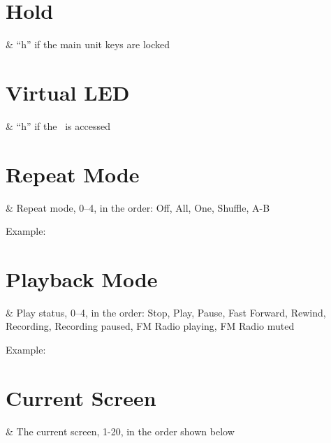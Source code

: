 \section{Hold}
    \begin{tagmap}
         & ``h'' if the main unit keys are locked\\
    \end{tagmap}

\section{Virtual LED}
  \begin{tagmap}
     & ``h'' if the \disk\ is accessed\\
  \end{tagmap}

\section{Repeat Mode}
  \begin{tagmap}
     & Repeat mode, 0--4, in the order: Off, All, One, Shuffle, A-B\\
  \end{tagmap}
Example: 

\section{Playback Mode}
  \begin{tagmap}
     & Play status, 0--4, in the order: Stop, Play, Pause,
           Fast Forward, Rewind, Recording, Recording paused, FM Radio playing,
           FM Radio muted\\
  \end{tagmap}
Example: 

\section{Current Screen}
  \begin{tagmap}
     & The current screen, 1-20, in the order shown below\\
  \end{tagmap}


